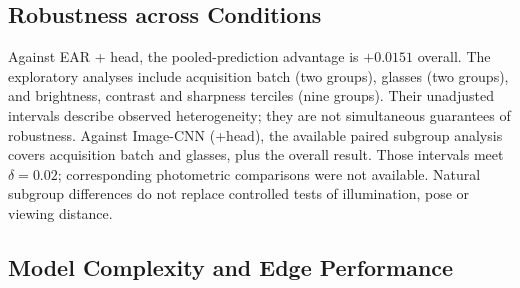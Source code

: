 \documentclass{IEEEmce}
\begin{document}
\subsection{Robustness across Conditions}
Against EAR + head, the pooled-prediction advantage is $+0.0151$ overall. The exploratory
analyses include acquisition batch (two groups), glasses (two groups), and brightness,
contrast and sharpness terciles (nine groups). Their unadjusted intervals describe
observed heterogeneity; they are not simultaneous guarantees of robustness. Against
Image-CNN (+head), the available paired subgroup analysis covers acquisition batch and
glasses, plus the overall result. Those intervals meet $\delta=0.02$; corresponding
photometric comparisons were not available. Natural subgroup differences do not replace
controlled tests of illumination, pose or viewing distance.


\subsection{Model Complexity and Edge Performance}
\label{sec_edge}
\end{document}
